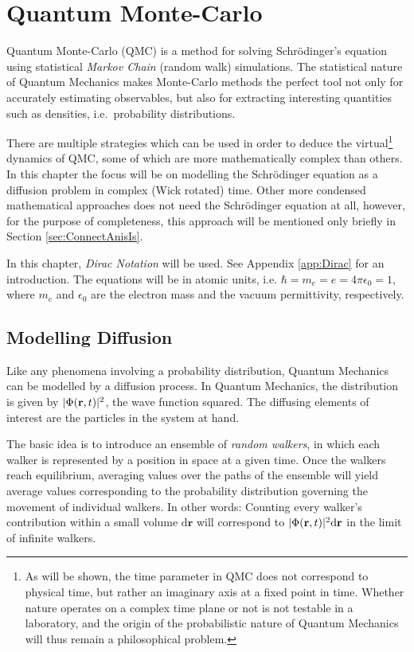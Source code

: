 \chapter{Quantum Monte-Carlo}
\label{ch:QMC}

Quantum Monte-Carlo (QMC) is a method for solving Schrödinger's equation using statistical \textit{Markov Chain} (random walk) simulations. The statistical nature of Quantum Mechanics makes Monte-Carlo methods the perfect tool not only for accurately estimating observables, but also for extracting interesting quantities such as densities, i.e.~probability distributions. 

There are multiple strategies which can be used in order to deduce the virtual\footnote{As will be shown, the time parameter in QMC does not correspond to physical time, but rather an imaginary axis at a fixed point in time. Whether nature operates on a complex time plane or not is not testable in a laboratory, and the origin of the probabilistic nature of Quantum Mechanics will thus remain a philosophical problem.} dynamics of QMC, some of which are more mathematically complex than others. In this chapter the focus will be on modelling the Schrödinger equation as a diffusion problem in complex (Wick rotated) time. Other more condensed mathematical approaches does not need the Schrödinger equation at all, however, for the purpose of completeness, this approach will be mentioned only briefly in Section \ref{sec:ConnectAnisIs}.

In this chapter, \textit{Dirac Notation} will be used. See Appendix \ref{app:Dirac} for an introduction. The equations will be in atomic units, i.e. $\hbar = m_e = e = 4\pi\epsilon_0 = 1$, where $m_e$ and $\epsilon_0$ are the electron mass and the vacuum permittivity, respectively.

\section{Modelling Diffusion}

Like any phenomena involving a probability distribution, Quantum Mechanics can be modelled by a diffusion process. In Quantum Mechanics, the distribution is given by $|\Phi(\mathbf{r}, t)|^2$, the wave function squared. The diffusing elements of interest are the particles in the system at hand. 

The basic idea is to introduce an ensemble of \textit{random walkers}, in which each walker is represented by a position in space at a given time. Once the walkers reach equilibrium, averaging values over the paths of the ensemble will yield average values corresponding to the probability distribution governing the movement of individual walkers. In other words: Counting every walker's contribution within a small volume $\mathrm{d}\mathbf{r}$ will correspond to $|\Phi(\mathbf{r}, t)|^2\mathrm{d}\mathbf{r}$ in the limit of infinite walkers.


